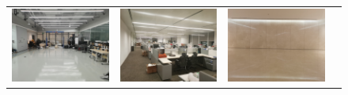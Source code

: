 \documentclass[conference]{IEEEtran}
\begin{document}
	\begin{figure}
		\begin{center}
			\begin{tabular}{cccc}
				\includegraphics[scale=0.024]{fig/room.jpg} &
				\includegraphics[scale=0.024]{fig/office.jpg} &
				\includegraphics[scale=0.024]{fig/wall.jpg}&

\end{tabular}
\end{center}
\end{figure}
\end{document}
